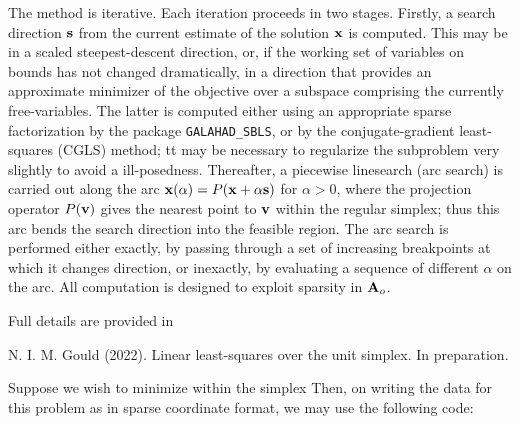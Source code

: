 \documentclass{galahad}
\begin{document}
The method is iterative. Each iteration proceeds in two stages.
Firstly, a search direction ${\mathbf{s}}$ from the current estimate of the solution
${\mathbf{x}}$ is computed. This may be in a scaled steepest-descent direction, or,
if the working set of variables on bounds has not changed dramatically,
in a direction that provides an approximate minimizer of the objective
over a subspace comprising the currently free-variables. The latter is
computed either using an appropriate sparse factorization by the
package {\tt GALAHAD\_SBLS}, or by the
conjugate-gradient least-squares (CGLS) method; tt may be necessary to
regularize the subproblem very slightly to avoid a ill-posedness.
Thereafter, a piecewise linesearch (arc search) is carried out along
the arc ${\mathbf{x}}(\alpha) = P( {\mathbf{x}} + \alpha {\mathbf{s}})$ for $\alpha > 0$,
where the projection operator $P({\mathbf{v}})$ gives the nearest point to ${\mathbf{v}}$ 
within the regular simplex;
thus this arc bends the search direction into the feasible region.
The arc search is performed either exactly, by passing through a set
of increasing breakpoints at which it changes direction, or inexactly,
by evaluating a sequence of different $\alpha$  on the arc.
All computation is designed to exploit sparsity in ${\mathbf{A}}_o$.

\vspace*{1mm}

\galreferences
\vspace*{1mm}

\noindent
Full details are provided in
\vspace*{1mm}

\noindent
N. I. M. Gould (2022).
Linear least-squares over the unit simplex.
In preparation.


\galexample
Suppose we wish to minimize
within the simplex
Then, on writing the data for this problem as
in sparse coordinate format, we may use the following code:
\end{document}
